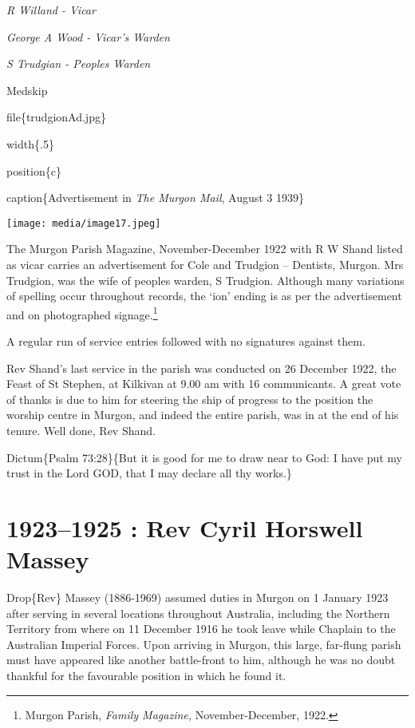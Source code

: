 \emph{R Willand - Vicar}

\emph{George A Wood - Vicar's Warden}

\emph{S Trudgian - Peoples Warden}

Medskip

file\{trudgionAd.jpg\}

width\{.5\}

position\{c\}

caption\{Advertisement in \emph{The Murgon Mail}, August 3 1939\}

\texttt{[image: media/image17.jpeg]}

The Murgon Parish Magazine, November-December 1922 with R W Shand listed as vicar carries an advertisement for Cole and Trudgion -- Dentists, Murgon. Mrs Trudgion, was the wife of peoples warden, S Trudgion. Although many variations of spelling occur throughout records, the `ion' ending is as per the advertisement and on photographed signage.\footnote{Murgon Parish, \emph{Family Magazine,} November-December, 1922.}

A regular run of service entries followed with no signatures against them.

Rev Shand's last service in the parish was conducted on 26 December 1922, the Feast of St Stephen, at Kilkivan at 9.00 am with 16 communicants. A great vote of thanks is due to him for steering the ship of progress to the position the worship centre in Murgon, and indeed the entire parish, was in at the end of his tenure. Well done, Rev Shand.

\begin{quote}
\end{quote}

Dictum\{Psalm 73:28\}\{But it is good for me to draw near to God: I have put my trust in the Lord GOD, that I may declare all thy works.\}

\hypertarget{rev-cyril-horswell-massey}{%
\chapter{1923--1925 : Rev Cyril Horswell Massey}\label{rev-cyril-horswell-massey}}

Drop\{Rev\} Massey (1886-1969) assumed duties in Murgon on 1 January 1923 after serving in several locations throughout Australia, including the Northern Territory from where on 11 December 1916 he took leave while Chaplain to the Australian Imperial Forces. Upon arriving in Murgon, this large, far-flung parish must have appeared like another battle-front to him, although he was no doubt thankful for the favourable position in which he found it.

